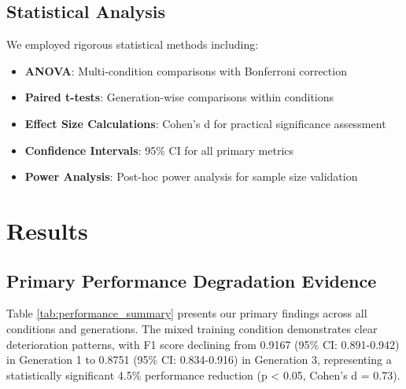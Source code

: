 \documentclass{article}
\begin{document}
\subsection{Statistical Analysis}

We employed rigorous statistical methods including:
\begin{itemize}
\item \textbf{ANOVA}: Multi-condition comparisons with Bonferroni correction
\item \textbf{Paired t-tests}: Generation-wise comparisons within conditions
\item \textbf{Effect Size Calculations}: Cohen's d for practical significance assessment
\item \textbf{Confidence Intervals}: 95\% CI for all primary metrics
\item \textbf{Power Analysis}: Post-hoc power analysis for sample size validation
\end{itemize}

\section{Results}

\subsection{Primary Performance Degradation Evidence}

Table \ref{tab:performance_summary} presents our primary findings across all conditions and generations. The mixed training condition demonstrates clear deterioration patterns, with F1 score declining from 0.9167 (95\% CI: 0.891-0.942) in Generation 1 to 0.8751 (95\% CI: 0.834-0.916) in Generation 3, representing a statistically significant 4.5\% performance reduction (p < 0.05, Cohen's d = 0.73).
\end{document}
